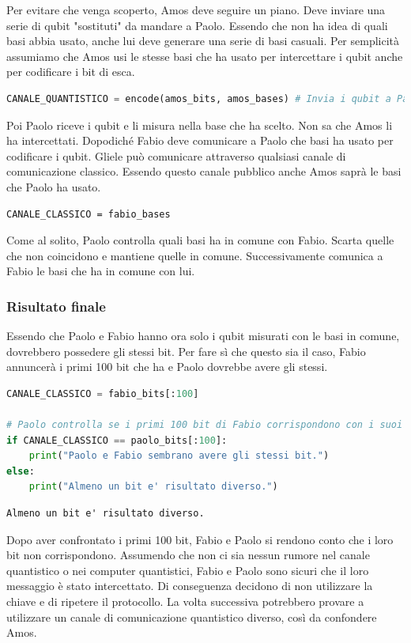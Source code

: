 \documentclass[a4paper]{article}
\begin{document}
Per evitare che venga scoperto, Amos deve seguire un piano. Deve inviare una serie di qubit
"sostituti" da mandare a Paolo. Essendo che non ha idea di quali basi abbia usato,
anche lui deve generare una serie di basi casuali. Per semplicità 
assumiamo che Amos usi le stesse basi che ha usato per intercettare i qubit anche per 
codificare i bit di esca.
\begin{lstlisting}[language=Python]
CANALE_QUANTISTICO = encode(amos_bits, amos_bases) # Invia i qubit a Paolo
\end{lstlisting}
Poi Paolo riceve i qubit e li misura nella base che ha scelto. Non sa che Amos li ha intercettati.
Dopodiché Fabio deve comunicare a Paolo che basi ha usato per codificare i qubit. 
Gliele può comunicare attraverso qualsiasi canale di comunicazione classico. Essendo questo canale pubblico
anche Amos saprà le basi che Paolo ha usato.
\begin{lstlisting}
CANALE_CLASSICO = fabio_bases
\end{lstlisting}
Come al solito, Paolo controlla quali basi ha in comune con Fabio. Scarta quelle che non
coincidono e mantiene quelle in comune.
Successivamente comunica a Fabio le basi che ha in comune con lui.

\subsubsection*{Risultato finale}

Essendo che Paolo e Fabio hanno ora solo i qubit misurati con le basi in comune, dovrebbero possedere gli stessi bit.
Per fare sì che questo sia il caso, Fabio annuncerà i primi 100 bit che ha e Paolo dovrebbe avere gli stessi.
\begin{lstlisting}[language=Python]
CANALE_CLASSICO = fabio_bits[:100] 

# Paolo controlla se i primi 100 bit di Fabio corrispondono con i suoi primi 100 bit
if CANALE_CLASSICO == paolo_bits[:100]:
    print("Paolo e Fabio sembrano avere gli stessi bit.")
else:
    print("Almeno un bit e' risultato diverso.")
\end{lstlisting}
\begin{lstlisting}
Almeno un bit e' risultato diverso.
\end{lstlisting}
Dopo aver confrontato i primi 100 bit, Fabio e Paolo
si rendono conto che i loro bit non corrispondono. Assumendo che non ci sia nessun rumore nel canale quantistico
o nei computer quantistici,
Fabio e Paolo sono sicuri che il loro messaggio è stato intercettato.
Di conseguenza decidono di non utilizzare la chiave e di ripetere il protocollo.
La volta successiva potrebbero provare a utilizzare un canale di comunicazione quantistico
diverso, così da confondere Amos.


 
\end{document}

